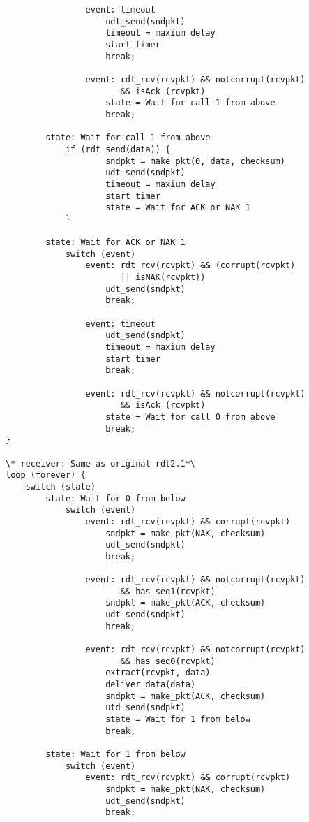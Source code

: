 \begin{enumerate}
\begin{lstlisting}
                event: timeout
                    udt_send(sndpkt)
                    timeout = maxium delay
                    start timer
                    break;

                event: rdt_rcv(rcvpkt) && notcorrupt(rcvpkt)
                       && isAck (rcvpkt)
                    state = Wait for call 1 from above
                    break;

        state: Wait for call 1 from above
            if (rdt_send(data)) {
                    sndpkt = make_pkt(0, data, checksum)
                    udt_send(sndpkt)
                    timeout = maxium delay
                    start timer
                    state = Wait for ACK or NAK 1
            }

        state: Wait for ACK or NAK 1 
            switch (event)
                event: rdt_rcv(rcvpkt) && (corrupt(rcvpkt)
                       || isNAK(rcvpkt))
                    udt_send(sndpkt)
                    break;

                event: timeout
                    udt_send(sndpkt)
                    timeout = maxium delay
                    start timer
                    break;

                event: rdt_rcv(rcvpkt) && notcorrupt(rcvpkt)
                       && isAck (rcvpkt)
                    state = Wait for call 0 from above
                    break;
}

\* receiver: Same as original rdt2.1*\
loop (forever) {
    switch (state)
        state: Wait for 0 from below
            switch (event)
                event: rdt_rcv(rcvpkt) && corrupt(rcvpkt)
                    sndpkt = make_pkt(NAK, checksum)
                    udt_send(sndpkt)
                    break;

                event: rdt_rcv(rcvpkt) && notcorrupt(rcvpkt)
                       && has_seq1(rcvpkt)
                    sndpkt = make_pkt(ACK, checksum)
                    udt_send(sndpkt)
                    break;

                event: rdt_rcv(rcvpkt) && notcorrupt(rcvpkt)
                       && has_seq0(rcvpkt)
                    extract(rcvpkt, data)
                    deliver_data(data)
                    sndpkt = make_pkt(ACK, checksum)
                    utd_send(sndpkt)
                    state = Wait for 1 from below
                    break;

        state: Wait for 1 from below
            switch (event)
                event: rdt_rcv(rcvpkt) && corrupt(rcvpkt)
                    sndpkt = make_pkt(NAK, checksum)
                    udt_send(sndpkt)
                    break;


\end{lstlisting}
\end{enumerate}
